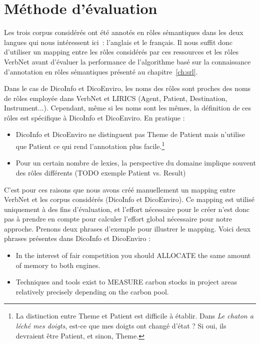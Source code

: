 \section{Méthode d'évaluation}

Les trois corpus considérés ont été annotés en rôles sémantiques dans les deux
langues qui nous intéressent ici~: l'anglais et le français. Il nous suffit
donc d'utiliser un mapping entre les rôles considérés par ces ressources et les
rôles VerbNet avant d'évaluer la performance de l'algorithme basé sur la
connaissance d'annotation en rôles sémantiques présenté au
chapitre~\ref{ch:srl}.

Dans le cas de DicoInfo et DicoEnviro, les noms des rôles sont proches des noms
de rôles employée dans VerbNet et LIRICS \citep{bonial2011hierarchical} (Agent,
Patient, Destination, Instrument...). Cependant, même si les noms sont les
mêmes, la définition de ces rôles est spécifique à DicoInfo et DicoEnviro.
En pratique :

\begin{itemize}
    \item DicoInfo et DicoEnviro ne distinguent pas Theme de Patient mais
    n'utilise que Patient ce qui rend l'annotation plus facile.\footnote{La
    distinction entre Theme et Patient est difficile à établir. Dans \textit{Le
    chaton a léché mes doigts}, est-ce que mes doigts ont changé d'état ? Si oui,
    ils devraient être Patient, et sinon, Theme.\citep[p.~5]{palmer2010semantic}}
    \item Pour un certain nombre de lexies, la perspective du domaine implique
    souvent des rôles différents (TODO exemple Patient vs. Result) %
\end{itemize}

C'est pour ces raisons que nous avons créé manuellement un mapping entre
VerbNet et les corpus considérés (DicoInfo et DicoEnviro). Ce mapping est
utilisé uniquement à des fins d'évaluation, et l'effort nécessaire pour le
créer n'est donc pas à prendre en compte pour calculer l'effort global
nécessaire pour notre approche. Prenons deux phrases d'exemple pour illustrer
le mapping. Voici deux phrases présentes dans DicoInfo et DicoEnviro :

\begin{itemize}
    \item In the interest of fair competition you should ALLOCATE the same amount of memory to both engines.
    \item Techniques and tools exist to MEASURE carbon stocks in project areas relatively precisely depending on the carbon pool.
\end{itemize}

